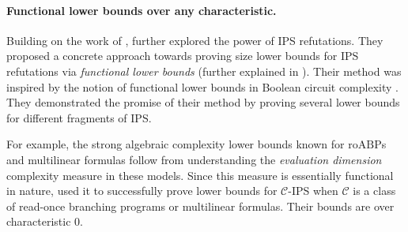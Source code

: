 \documentclass[11pt]{article}
\newcommand{\roABP}{\mathrm{roABP}}
\newcommand{\ACz}{\text{AC}^0}
\begin{document}
\paragraph{Functional lower bounds over any characteristic.}
Building on the work of \cite{GP14}, \cite{FSTW21} further explored the power of IPS refutations. They proposed a concrete approach towards proving size lower bounds for IPS refutations via 
\emph{functional lower bounds} (further explained in ). Their method was inspired by the notion of functional lower bounds in Boolean circuit complexity \cite{Grigoriev-Razborov, FKS16}. They demonstrated the promise of their method by proving several lower bounds for different fragments of IPS.


For example, the strong algebraic complexity lower bounds known for $\roABP$s \cite{Nisan} and multilinear formulas \cite{Raz-2009} follow from understanding the \emph{evaluation dimension} complexity measure in these models. Since this measure is essentially functional in nature, \cite{FSTW21} used it to successfully prove lower bounds for $\mathcal{C}$-IPS when $\mathcal{C}$ is a class of read-once branching programs or multilinear formulas. Their bounds are over characteristic $0$.  






\end{document}
